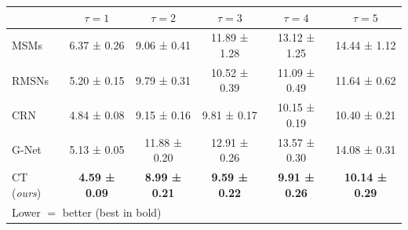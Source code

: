 \addtolength{\tabcolsep}{-1.5pt}  
\begin{tabular}{l|c|cccc}
\toprule
{} &            $\tau = 1$ &            $\tau = 2$ &            $\tau = 3$ &            $\tau = 4$ &             $\tau = 5$ \\
\midrule
MSMs       &           6.37 ± 0.26 &           9.06 ± 0.41 &          11.89 ± 1.28 &          13.12 ± 1.25 &           14.44 ± 1.12 \\
RMSNs      &           5.20 ± 0.15 &           9.79 ± 0.31 &          10.52 ± 0.39 &          11.09 ± 0.49 &           11.64 ± 0.62 \\
CRN       &  4.84 ± 0.08 &           9.15 ± 0.16 &           9.81 ± 0.17 &          10.15 ± 0.19 &           10.40 ± 0.21 \\
G-Net     &           5.13 ± 0.05 &          11.88 ± 0.20 &          12.91 ± 0.26 &          13.57 ± 0.30 &           14.08 ± 0.31 \\
\midrule
CT (\emph{ours}) &           \textbf{4.59 ± 0.09} &  \textbf{8.99 ± 0.21} &  \textbf{9.59 ± 0.22} &  \textbf{9.91 ± 0.26} &  \textbf{10.14 ± 0.29} \\
\bottomrule
\multicolumn{6}{l}{Lower $=$ better (best in bold) }
\end{tabular}
\addtolength{\tabcolsep}{1.5pt}  
